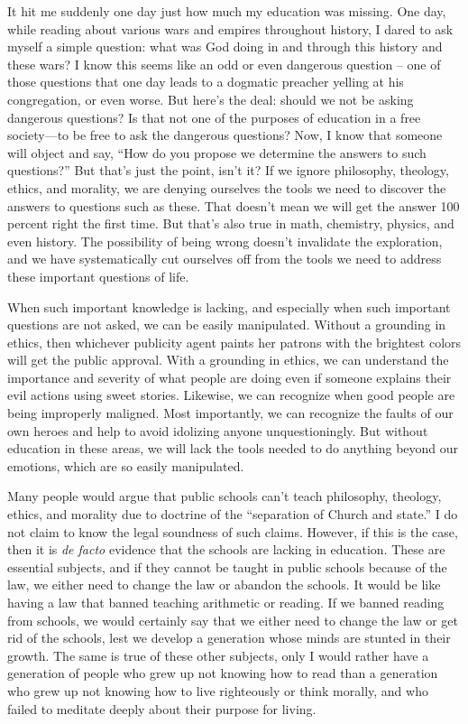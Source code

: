 It hit me suddenly one day just how much my education was missing. One
day, while reading about various wars and empires throughout history, I
dared to ask myself a simple question: what was God doing in and
through this history and these wars?  I know this seems like an odd or
even dangerous question – one of those questions that one day leads to
a dogmatic preacher yelling at
his congregation, or
even worse. But here’s the deal: should we not be asking dangerous
questions?  Is that not one of the purposes of education in a free
society---to be free to ask the dangerous questions?  Now, I know that
someone will object and say, “How do you propose we determine the answers to such questions?” 
But that’s just the point, isn’t it?  If we ignore philosophy,
theology, ethics, and morality, we are denying ourselves the tools we
need to discover the answers to questions such as these. That doesn’t mean we
will get the answer 100 percent right the first time. But that’s also
true in math, chemistry, physics, and even history. The possibility of
being wrong doesn’t invalidate the exploration, and we have
systematically cut ourselves off from the tools we need to address
these important questions of life. 

When such important knowledge is lacking, and especially when such
important questions are not asked, we can be easily manipulated.
Without a grounding in ethics, then whichever publicity agent paints
her patrons with the
brightest colors will get the public approval. With a grounding in
ethics, we can understand the importance and severity of what people
are doing even if someone explains their evil actions using sweet
stories. Likewise, we can recognize when good people are being
improperly maligned. Most importantly, we can recognize the faults of
our own heroes and help to avoid idolizing anyone unquestioningly. But
without education in these areas, we will lack the tools needed to do
anything beyond our emotions, which are so easily manipulated.

\begin{policynote}
Many people would argue that public schools can't teach philosophy,
theology, ethics, and morality due to doctrine of the ``separation of
Church and state.'' I do not claim to know the legal soundness of such
claims.  However, if this is the case, then it is \textit{de facto} evidence
that the schools are lacking in education.  These are essential subjects,
and if they cannot be taught in public schools because of the law, we
either need to change the law or abandon the schools.  It would be like
having a law that banned teaching arithmetic or reading.  If we banned
reading from schools, we would certainly say that we either need to change
the law or get rid of the schools, lest we develop a generation whose minds
are stunted in their growth.  The same is true of these other subjects, only
I would rather have a generation of people who grew up not knowing how to
read than a generation who grew up not knowing how to live righteously or
think morally, and who failed to meditate deeply about their purpose for living.
\end{policynote}


